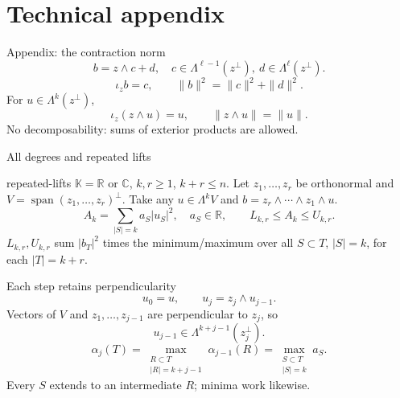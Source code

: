 \documentclass{beamer}
\begin{document}
\section{Technical appendix}
\begin{frame}{Appendix: the contraction norm}
\[
b=z\wedge c+d,
\quad c\in\Lambda^{\ell-1}(z^\perp),\ d\in\Lambda^\ell(z^\perp).
\]
\[
\iota_zb=c,\qquad\|b\|^2=\|c\|^2+\|d\|^2.
\]
For $u\in\Lambda^k(z^\perp)$,
\[
\iota_z(z\wedge u)=u,\qquad\|z\wedge u\|=\|u\|.
\]
No decomposability: sums of exterior products are allowed.
\end{frame}
\begin{frame}{All degrees and repeated lifts}
\small
\begin{bookresult}{repeated-lifts}
$\mathbb K=\mathbb R$ or $\mathbb C$, $k,r\ge1$, $k+r\le n$. Let $z_1,\ldots,z_r$ be orthonormal and $V=\operatorname{span}(z_1,\ldots,z_r)^\perp$. Take any $u\in\Lambda^kV$ and $b=z_r\wedge\cdots\wedge z_1\wedge u$.
\[
A_k=\sum_{|S|=k}a_S|u_S|^2,\quad a_S\in\mathbb R,
\qquad L_{k,r}\le A_k\le U_{k,r}.
\]
$L_{k,r},U_{k,r}$ sum $|b_T|^2$ times the minimum/maximum over all $S\subset T$, $|S|=k$, for each $|T|=k+r$.
\end{bookresult}
\end{frame}
\begin{frame}{Each step retains perpendicularity}
\[
u_0=u,\qquad u_j=z_j\wedge u_{j-1}.
\]
Vectors of $V$ and $z_1,\ldots,z_{j-1}$ are perpendicular to $z_j$, so
\[
u_{j-1}\in\Lambda^{k+j-1}(z_j^\perp).
\]
\[
\alpha_j(T)=\max_{\substack{R\subset T\\|R|=k+j-1}}\alpha_{j-1}(R)
=\max_{\substack{S\subset T\\|S|=k}}a_S.
\]
Every $S$ extends to an intermediate $R$; minima work likewise.
\end{frame}
\end{document}
